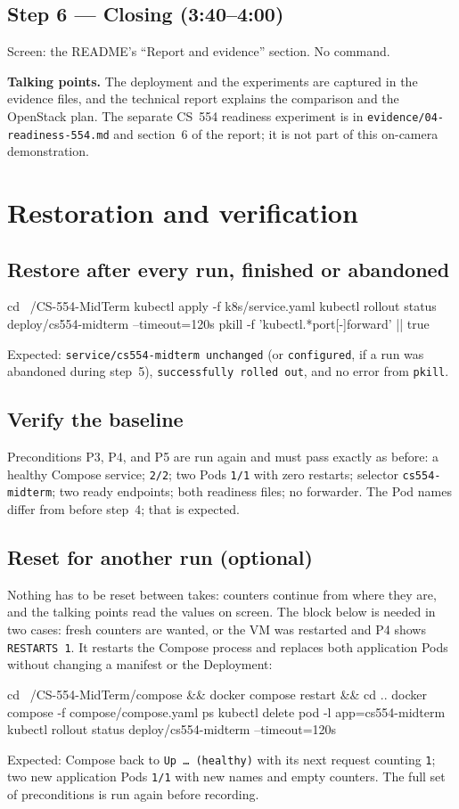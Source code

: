 \documentclass[11pt,letterpaper]{article}
\newcommand{\code}[1]{\texttt{#1}}
\newcommand{\talk}[1]{\begin{shaded*}\noindent\textbf{Talking points.} #1\end{shaded*}}
\begin{document}
\subsection*{Step 6 --- Closing (3:40--4:00)}
Screen: the README's ``Report and evidence'' section. No command.
\talk{The deployment and the experiments are captured in the evidence files, and the technical report explains the comparison and the OpenStack plan. The separate CS~554 readiness experiment is in \code{evidence/04-readiness-554.md} and section~6 of the report; it is not part of this on-camera demonstration.}

\section{Restoration and verification}

\subsection*{Restore after every run, finished or abandoned}
\begin{cmd}
cd ~/CS-554-MidTerm
kubectl apply -f k8s/service.yaml
kubectl rollout status deploy/cs554-midterm --timeout=120s
pkill -f 'kubectl.*port[-]forward' || true
\end{cmd}
Expected: \code{service/cs554-midterm unchanged} (or \code{configured}, if a run was abandoned during step~5), \code{successfully rolled out}, and no error from \code{pkill}.

\subsection*{Verify the baseline}
Preconditions P3, P4, and P5 are run again and must pass exactly as before: a healthy Compose service; \code{2/2}; two Pods \code{1/1} with zero restarts; selector \code{cs554-midterm}; two ready endpoints; both readiness files; no forwarder. The Pod names differ from before step~4; that is expected.

\subsection*{Reset for another run (optional)}
Nothing has to be reset between takes: counters continue from where they are, and the talking points read the values on screen. The block below is needed in two cases: fresh counters are wanted, or the VM was restarted and P4 shows \code{RESTARTS 1}. It restarts the Compose process and replaces both application Pods without changing a manifest or the Deployment:
\begin{cmd}
cd ~/CS-554-MidTerm/compose && docker compose restart && cd ..
docker compose -f compose/compose.yaml ps
kubectl delete pod -l app=cs554-midterm
kubectl rollout status deploy/cs554-midterm --timeout=120s
\end{cmd}
Expected: Compose back to \code{Up \ldots\ (healthy)} with its next request counting \code{1}; two new application Pods \code{1/1} with new names and empty counters. The full set of preconditions is run again before recording.
\end{document}
